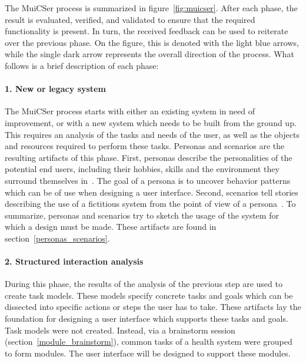         The MuiCSer process is summarized in figure~\ref{fig:muicser}. After each phase, the result is evaluated, verified, and validated to ensure that the required functionality is present. In turn, the received feedback can be used to reiterate over the previous phase. On the figure, this is denoted with the light blue arrows, while the single dark arrow represents the overall direction of the process. What follows is a brief description of each phase:

        \paragraph{1. New or legacy system} The MuiCSer process starts with either an existing system in need of improvement, or with a new system which needs to be built from the ground up. This requires an analysis of the tasks and needs of the user, as well as the objects and resources required to perform these tasks. Personas and scenarios are the resulting artifacts of this phase. First, personas describe the personalities of the potential end users, including their hobbies, skills and the environment they surround themselves in~\cite{Madsen2010}. The goal of a persona is to uncover behavior patterns which can be of use when designing a user interface. Second, scenarios tell stories describing the use of a fictitious system from the point of view of a persona~\cite{Madsen2010}. To summarize, personas and scenarios try to sketch the usage of the system for which a design must be made. These artifacts are found in section~\ref{personas_scenarios}.

        \paragraph{2. Structured interaction analysis} During this phase, the results of the analysis of the previous step are used to create task models. These models specify concrete tasks and goals which can be dissected into specific actions or steps the user has to take. These artifacts lay the foundation for designing a user interface which supports these tasks and goals. Task models were not created. Instead, via a brainstorm session (section~\ref{module_brainstorm}), common tasks of a health system were grouped to form modules. The user interface will be designed to support these modules.

